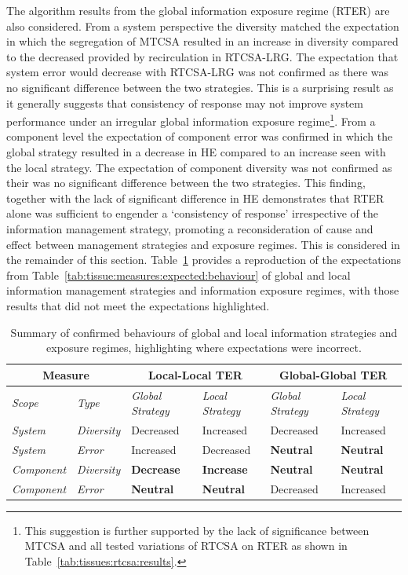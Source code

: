 The algorithm results from the global information exposure regime (RTER) are also considered.
From a system perspective the diversity matched the expectation in which the segregation of MTCSA resulted in an increase in diversity compared to the decreased provided by recirculation in RTCSA-LRG. The expectation that system error would decrease with RTCSA-LRG was not confirmed as there was no significant difference between the two strategies. This is a surprising result as it generally suggests that consistency of response may not improve system performance under an irregular global information exposure regime\footnote{This suggestion is further supported by the lack of significance between MTCSA and all tested variations of RTCSA on RTER as shown in Table~\ref{tab:tissues:rtcsa:results}.}. 
From a component level the expectation of component error was confirmed in which the global strategy resulted in a decrease in HE compared to an increase seen with the local strategy. The expectation of component diversity was not confirmed as their was no significant difference between the two strategies. This finding, together with the lack of significant difference in HE demonstrates that RTER alone was sufficient to engender a `consistency of response' irrespective of the information management strategy, promoting a reconsideration of cause and effect between management strategies and exposure regimes. This is considered in the remainder of this section.
Table~\ref{tab:tissue:rtcsa:expected:confirmed} provides a reproduction of the expectations from Table~\ref{tab:tissue:measures:expected:behaviour} of global and local information management strategies and information exposure regimes, with those results that did not meet the expectations highlighted.

\begin{table}[ht]
	\centering\small
		\begin{tabular}{llllll}
		\toprule
		\multicolumn{2}{c}{Measure} & \multicolumn{2}{c}{Local-Local TER} & \multicolumn{2}{c}{Global-Global TER} \\ 
		\midrule
		\emph{Scope} & \emph{Type} & \emph{Global Strategy} & \emph{Local Strategy} & \emph{Global Strategy} & \emph{Local Strategy} \\ 
		\toprule	
		\emph{System} & \emph{Diversity} 	  & Decreased & Increased & Decreased & Increased \\ 
		\emph{System} & \emph{Error} 			  & Increased & Decreased & \textbf{Neutral} & \textbf{Neutral} \\ 		
		\emph{Component} & \emph{Diversity} & \textbf{Decrease} & \textbf{Increase} & \textbf{Neutral} & \textbf{Neutral} \\ 
		\emph{Component} & \emph{Error}  	  & \textbf{Neutral} & \textbf{Neutral} & Decreased & Increased \\ 
		\bottomrule
		\end{tabular}
	\caption{Summary of confirmed behaviours of global and local information strategies and exposure regimes, highlighting where expectations were incorrect.}
	\label{tab:tissue:rtcsa:expected:confirmed}
\end{table}

